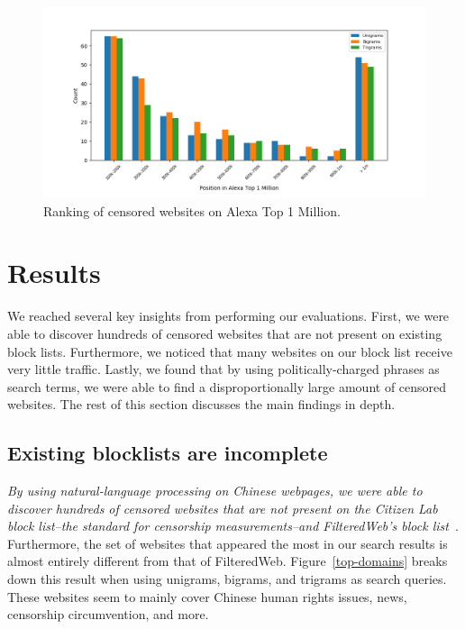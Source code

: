 \begin{figure}[t]
  \centering
  \includegraphics[scale=0.6]{figures/alexa}
  \caption{\label{alexa}Ranking of censored websites on Alexa Top 1 Million.}
\end{figure}

\section{Results}
We reached several key insights from performing our
evaluations. First, we were able to discover hundreds of
censored websites that are not present on existing block
lists. Furthermore, we noticed that many websites on our block list
receive very little traffic. Lastly, we found that by using
politically-charged phrases as search terms, we were able to find a
disproportionally large amount of censored websites. The rest of this
section discusses the main findings in depth.

\subsection{Existing blocklists are incomplete}
\textit{By using natural-language processing on Chinese webpages, we
were able to discover hundreds of censored websites that are not
present on the Citizen Lab block list--the standard for censorship
measurements--and FilteredWeb's block list~\cite{darer2017filteredweb,
citizenlab:block}}. Furthermore, the set of websites that appeared the
most in our search results is almost entirely different from that of
FilteredWeb. Figure~\ref{top-domains} breaks down this result when
using unigrams, bigrams, and trigrams as search queries. These websites seem
to mainly cover Chinese human rights issues, news, censorship
circumvention, and more.

